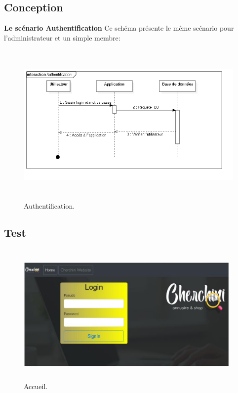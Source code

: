 
\subsection{Conception}
\textbf{Le sc\'{e}nario \guillemotleft{} Authentification \guillemotright{}}
Ce sch\'{e}ma pr\'{e}sente le m\^{e}me sc\'{e}nario pour l'administrateur et un simple
membre:


\begin{figure}[H]
\center
\includegraphics[width=14cm,height=8cm]{./figures/seq/A.png}
\caption{Authentification.}
\end{figure}


\subsection{Test}

\FloatBarrier
\begin{figure}[H]
\center
\includegraphics[width=11cm,height=7cm]{./figures/pres/1.png}
\caption{Accueil.}

\end{figure}
\FloatBarrier 